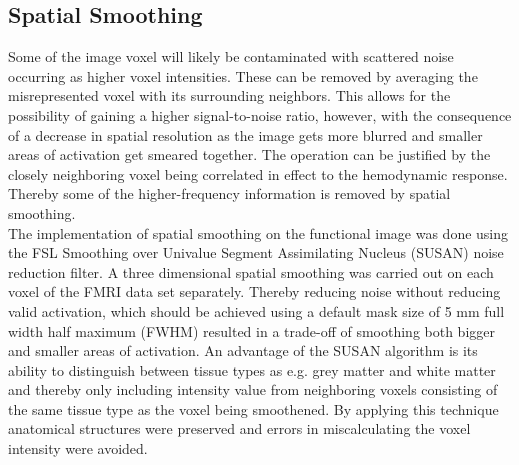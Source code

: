     
%
%

\subsection{Spatial Smoothing}

Some of the image voxel will likely be contaminated with scattered noise occurring as higher voxel intensities. These can be removed by averaging the misrepresented voxel with its surrounding neighbors. This allows for the possibility of gaining a higher signal-to-noise ratio, however, with the consequence of a decrease in spatial resolution as the image gets more blurred and smaller areas of activation get smeared together. The operation can be justified by the closely neighboring voxel being correlated in effect to the hemodynamic response. Thereby some of the higher-frequency information is removed by spatial smoothing. \cite{Poldrack2011} \\
The implementation of spatial smoothing on the functional image was done using the FSL Smoothing over Univalue Segment Assimilating Nucleus (SUSAN) noise reduction filter. A three dimensional spatial smoothing was carried out on each voxel of the FMRI data set separately. Thereby reducing noise without reducing valid activation, which should be achieved using a default mask size of 5 mm full width half maximum (FWHM) resulted in a trade-off of smoothing both bigger and smaller areas of activation. An advantage of the SUSAN algorithm is its ability to distinguish between tissue types as e.g. grey matter and white matter and thereby only including intensity value from neighboring voxels consisting of the same tissue type as the voxel being smoothened. By applying this technique anatomical structures were preserved and errors in miscalculating the voxel intensity were avoided. \cite{Smith1997}  


